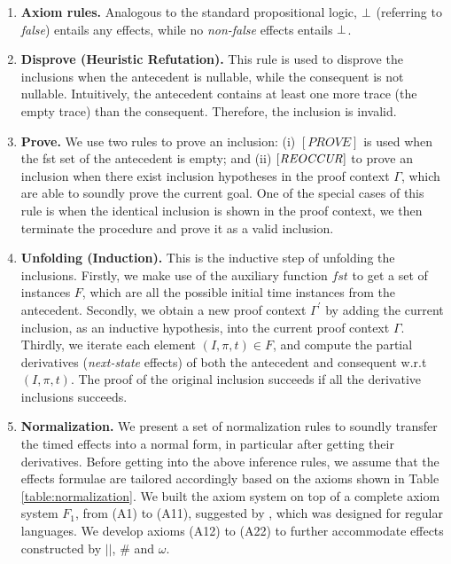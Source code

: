 \documentclass[acmsmall,10pt,review]{acmart}
\newcommand{\code}[1]{{\tt{\ensuremath{\m{#1}}}}}
\newcommand{\codeme}[1]{{\tt{\ensuremath{#1}}}}
\newcommand{\bott}{\textcolor{black}{\ensuremath{\bot}}}
\newcommand{\m}{\mathit}
\newcommand\tabref[1]{Table \textcolor{black}{\ref{#1}}.}
\begin{document}
\begin{enumerate}
\item 
\textbf{Axiom rules.}
\label{Base}
Analogous to  the standard propositional logic, \code{\bott} (referring to \textit{false}) entails any effects, while no \textit{non-false} effects entails \code{\bott}.


\item 
\textbf{Disprove (Heuristic Refutation).}
\label{Refutation}
This rule is used to disprove the inclusions when the antecedent is nullable, while the consequent is not nullable. Intuitively, the antecedent contains at least one more trace (the empty trace) than the consequent. Therefore, the inclusion is invalid. 

\vspace{-4mm}


\item 
\textbf{Prove.}
\label{Prove}
We use two rules to prove an inclusion: (i) \codeme{[PROVE]} is used when the fst set of the antecedent is empty; and (ii) $\code{[REOCCUR]}$ to prove an inclusion
when there exist inclusion hypotheses 
in the proof context $\m{\Gamma}$, which are able to soundly prove the current goal. One of the special cases of this rule is when the identical inclusion is shown in the proof context, we then terminate the procedure and prove it as a valid inclusion. 


\item 
\textbf{Unfolding (Induction).}
\label{unfolding}
This is the inductive step of unfolding the inclusions. Firstly, we make use of the auxiliary function \code{fst} to get a set of instances \code{F}, which are all the possible initial time instances from the antecedent. 
Secondly, we obtain a new proof context \code{\Gamma^\prime} by adding the current inclusion, as an inductive hypothesis, into the current proof context \code{\Gamma}. 
Thirdly, we iterate each element \code{(I, \pi, t) \in F}, and compute the partial derivatives (\emph{next-state} effects) of both the antecedent and consequent w.r.t \code{(I, \pi, t)}. The proof of the original inclusion succeeds if all the derivative inclusions succeeds.



\item 
\textbf{Normalization.}
We present a set of normalization rules to soundly transfer the timed effects into a normal form, in particular after getting their derivatives. 
Before getting into the above inference rules, we assume that the effects formulae are tailored accordingly based on the axioms shown in
\tabref{table:normalization}
We built the axiom system on top of a complete axiom system \code{F_1}, from (A1) to (A11), suggested by \cite{salomaa1966two}, which was designed for regular languages. We develop axioms (A12) to (A22) to further accommodate effects constructed by \code{||},   \code{\#} and \code{\omega}.




\end{enumerate}
\end{document}
